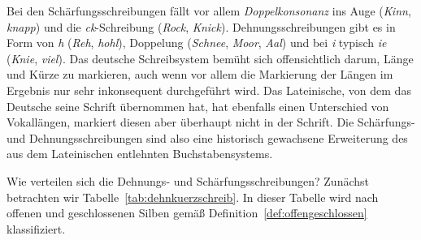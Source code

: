 

Bei den Schärfungsschreibungen fällt vor allem \textit{Doppelkonsonanz} ins Auge (\textit{Kinn}, \textit{knapp}) und die \textit{ck}-Schreibung (\textit{Rock}, \textit{Knick}).
Dehnungsschreibungen gibt es in Form von \textit{h} (\textit{Reh}, \textit{hohl}), Doppelung (\textit{Schnee}, \textit{Moor}, \textit{Aal}) und bei \textit{i} typisch \textit{ie} (\textit{Knie}, \textit{viel}).
Das deutsche Schreibsystem bemüht sich offensichtlich darum, Länge und Kürze zu markieren, auch wenn vor allem die Markierung der Längen im Ergebnis nur sehr inkonsequent durchgeführt wird.
Das Lateinische, von dem das Deutsche seine Schrift übernommen hat, hat ebenfalls einen Unterschied von Vokallängen, markiert diesen aber überhaupt nicht in der Schrift.
Die Schärfungs- und Dehnungsschreibungen sind also eine historisch gewachsene Erweiterung des aus dem Lateinischen entlehnten Buchstabensystems.

Wie verteilen sich die Dehnungs- und Schärfungsschreibungen?
Zunächst betrachten wir Tabelle~\ref{tab:dehnkuerzschreib}.
In dieser Tabelle wird nach offenen und geschlossenen Silben gemäß Definition~\ref{def:offengeschlossen} klassifiziert.

\newcommand{\LocStrutGrph}{\hspace{0.1\textwidth}}

